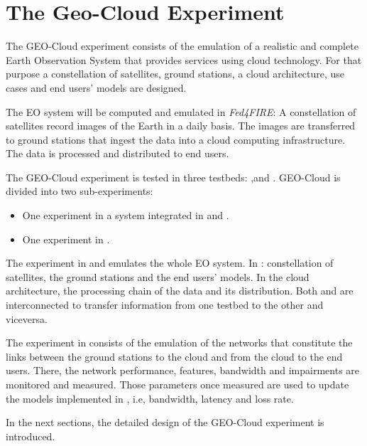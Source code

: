 
\chapter{The Geo-Cloud Experiment}
\label{chap:geocloud-experiment}
The GEO-Cloud experiment consists of the emulation of a realistic and complete Earth Observation System that provides services using cloud technology. For that purpose a constellation of satellites, ground stations, a cloud architecture, use cases and end users' models are designed.

The \ac{EO} system will be computed and emulated in \emph{Fed4FIRE}: A constellation of satellites record images of the Earth in a daily basis. The images are transferred to ground stations that ingest the data into a cloud computing infrastructure. The data is processed and distributed to end users.

The GEO-Cloud experiment is tested in three testbeds: \vw,\bonfire and
\pl. GEO-Cloud is divided into two sub-experiments:
\begin{itemize}
\item One experiment in a system integrated in \vw and \bonfire.
\item One experiment in \pl.
\end{itemize}

The experiment in \vw and \bonfire emulates the whole \ac{EO} system. In \vw:
constellation of satellites, the ground stations and the end users' models. In
\bonfire the cloud architecture, the processing chain of the data and its
distribution. Both \vw and \bonfire are interconnected to transfer information from one testbed to the other and viceversa.

The experiment in \pl consists of the emulation of the networks that constitute
the links between the ground stations to the cloud and from the cloud to the end
users. There, the network performance, features, bandwidth and impairments are
monitored and measured. Those parameters once measured are used to update the
models implemented in \vw, i.e, bandwidth, latency and loss rate.

In the next sections, the detailed design of the GEO-Cloud experiment is introduced.






